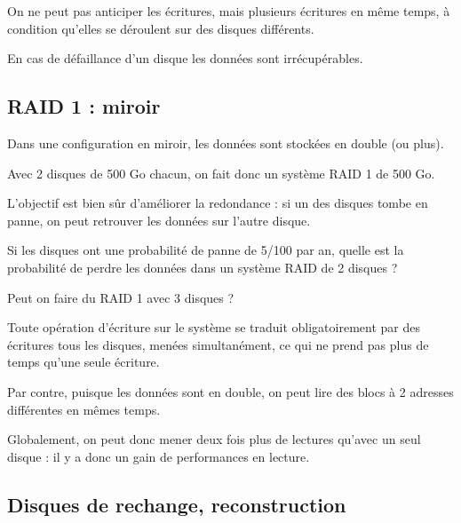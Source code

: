 \begin{multicols}{2}
On ne peut pas anticiper les écritures, mais  plusieurs écritures en même temps, à condition
qu'elles se déroulent sur des disques différents.



En cas de défaillance d'un disque les données sont irrécupérables.



\subsection{RAID 1 : miroir}

Dans une configuration en miroir, les données sont stockées en double
(ou plus).  



Avec 2 disques de 500 Go chacun, on fait donc un système RAID 1 de 500 Go.

L'objectif est bien sûr d'améliorer la redondance : si un
des disques tombe en panne, on peut retrouver les données sur l'autre disque.



\begin{exercice}
Si les disques ont une probabilité de panne de 5/100 par an, quelle est la
probabilité de perdre les données dans un système RAID de 2 disques ?
\end{exercice}

\begin{exercice}
Peut on faire du RAID 1 avec 3 disques ?
\end{exercice}



Toute opération d'écriture sur le système se traduit obligatoirement 
par des écritures tous les disques, menées simultanément, ce qui 
ne prend pas plus de temps qu'une seule écriture.


Par contre, puisque les données sont en double, on peut lire des blocs
à 2 adresses différentes en mêmes temps.


 Globalement, on peut donc
mener deux fois plus de lectures qu'avec un seul disque : il y a donc
un gain de performances en lecture.

\subsection{Disques de rechange, reconstruction}


\end{multicols}
